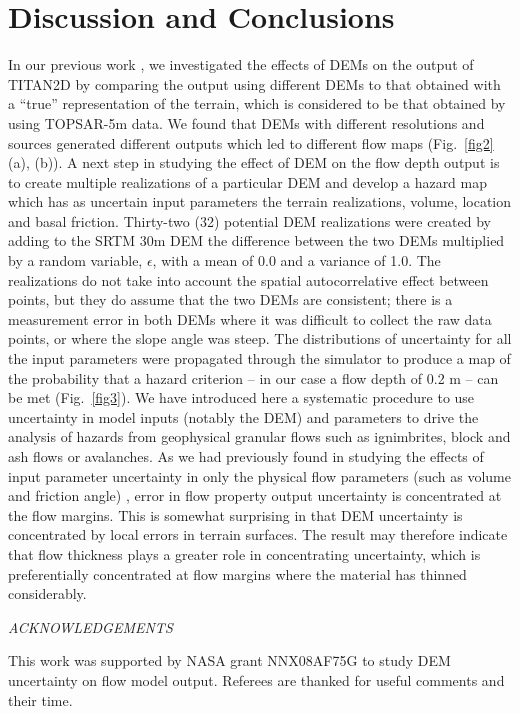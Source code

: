 \documentclass[a4paper,fleqn]{article}
\begin{document}
\section{Discussion and Conclusions}

In our previous work \citep{stefanescu1}, we investigated the effects
of DEMs on the output of TITAN2D by comparing the output using
different DEMs to that obtained with a ``true'' representation of the
terrain, which is considered to be that obtained by using TOPSAR-5m
data.  We found that DEMs with different resolutions and sources
generated different outputs which led to different flow maps
(Fig.~\ref{fig2} (a), (b)).  A next step in studying the effect of DEM
on the flow depth output is to create multiple realizations of a
particular DEM and develop a hazard map which has as uncertain input
parameters the terrain realizations, volume, location and basal
friction.
Thirty-two (32) potential DEM realizations were created by adding to
the SRTM 30m DEM the difference between the two DEMs multiplied by a
random variable, $\epsilon$, with a mean of 0.0 and a variance of 1.0.
The realizations do not take into account the spatial autocorrelative
effect between points, but they do assume that the two DEMs are
consistent; there is a measurement error in both DEMs where it was
difficult to collect the raw data points, or where the slope angle was
steep. The distributions of uncertainty for all the input parameters
were propagated through the simulator to produce a map of the
probability that a hazard criterion -- in our case a flow depth of 0.2
m -- can be met (Fig.~\ref{fig3}).
We have introduced here a systematic procedure to use uncertainty in
model inputs (notably the DEM) and parameters to drive the analysis of
hazards from geophysical granular flows such as ignimbrites, block and
ash flows or avalanches.  As we had previously found in studying the
effects of input parameter uncertainty in only the physical flow
parameters (such as volume and friction angle) \citep{Keith}, error in
flow property output uncertainty is concentrated at the flow margins.
This is somewhat surprising in that DEM uncertainty is concentrated by
local errors in terrain surfaces.  The result may therefore indicate
that flow thickness plays a greater role in concentrating uncertainty,
which is preferentially concentrated at flow margins where the
material has thinned considerably.


\centerline{\it ACKNOWLEDGEMENTS}
This work was supported by NASA grant NNX08AF75G to study DEM
uncertainty on flow model output.  Referees are thanked for useful
comments and their time.
\end{document}
